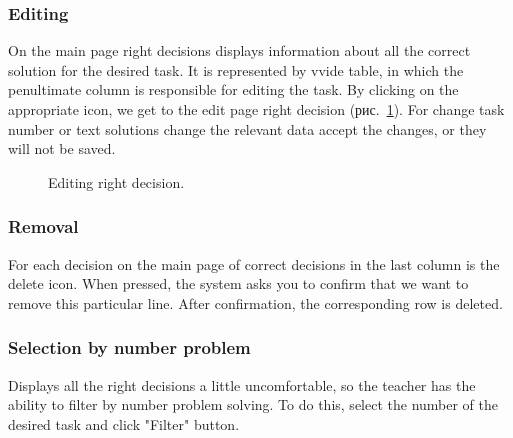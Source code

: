 \documentclass{acmtog} %
\begin{document}
\subsubsection*{Editing}
On the main page right decisions displays information about all the correct solution for the desired task. It is represented by vvide table, in which the penultimate column is responsible for editing the task. By clicking on the appropriate icon, we get to the edit page right decision (рис.~\ref{editcorrect}). For change task number or text solutions change the relevant data accept the changes, or they will not be saved.
\begin{figure}[h]
\caption{Editing right decision.}
\label{editcorrect}
\end{figure}

\subsubsection*{Removal}
For each decision on the main page of correct decisions in the last column is the delete icon. When pressed, the system asks you to confirm that we want to remove this particular line. After confirmation, the corresponding row is deleted.
\subsubsection*{Selection by number problem}
Displays all the right decisions a little uncomfortable, so the teacher has the ability to filter by number problem solving. To do this, select the number of the desired task and click "Filter" button.
\end{document}
